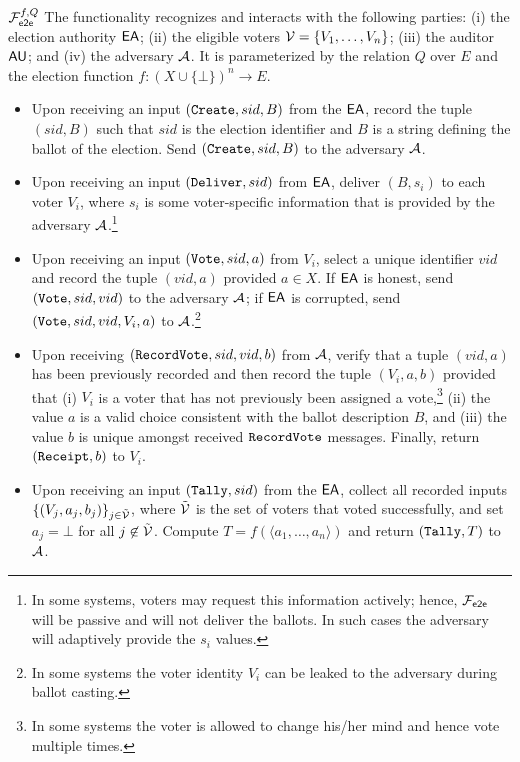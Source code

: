 \begin{nffunc}{$\mathcal{F}_{\mathsf{e2e}}^{f,Q}$}
  The functionality recognizes and interacts with the following
  parties: (i) the election authority $\mathsf{EA}$; (ii) the eligible voters
  $\mathcal{V}= \{V_1,\ldots, V_n\}$; (iii) the auditor $\mathsf{AU}$; and (iv) the
  adversary $\mathcal{A}$.  It is parameterized by the relation $Q$ over
  $E$ and the election function $f:(X\cup\{\bot\})^n \rightarrow E$.
\vspace{1ex}
\begin{itemize}
\item Upon receiving an input $(\mathtt{Create}, sid, B)$ from the $\mathsf{EA}$,
  record the tuple $(sid, B)$ such that $sid$ is the election
  identifier and $B$ is a string defining the ballot of the election.
  Send $(\mathtt{Create}, sid, B)$ to the adversary $\mathcal{A}$.

\item Upon receiving an input $(\mathtt{Deliver}, sid)$ from $\mathsf{EA}$, deliver
  $(B, s_i)$ to each voter $V_i$, where $s_i$ is some voter-specific
  information that is provided by the adversary $\mathcal{A}$.\footnote{In
    some systems, voters may request this information actively; hence,
    $\mathcal{F}_{\mathsf{e2e}}$ will be passive and will not deliver the ballots.  In such
    cases the adversary will adaptively provide the $s_i$ values.}

\item Upon receiving an input $(\mathtt{Vote}, sid, a)$ from $V_i$, select a
  unique identifier $vid$ and record the tuple $(vid, a)$ provided
  $a\in X$.  If $\mathsf{EA}$ is honest, send $(\mathtt{Vote},sid, vid)$ to the
  adversary $\mathcal{A}$; if $\mathsf{EA}$ is corrupted, send
  $(\mathtt{Vote}, sid, vid, V_i, a)$ to $\mathcal{A}$.\footnote{In some systems
    the voter identity $V_i$ can be leaked to the adversary during
    ballot casting.}

\item Upon receiving $(\mathtt{RecordVote}, sid, vid, b)$ from $\mathcal{A}$,
  verify that a tuple $(vid, a)$ has been previously recorded and then
  record the tuple $(V_i, a, b)$ provided that (i) $V_i$ is a voter
  that has not previously been assigned a vote,\footnote{In some
    systems the voter is allowed to change his/her mind and hence vote
    multiple times.} (ii) the value $a$ is a valid choice consistent
  with the ballot description $B$, and (iii) the value $b$ is unique
  amongst received $\mathtt{RecordVote}$ messages.  Finally, return
  $(\mathtt{Receipt}, b)$ to $V_i$.

\item Upon receiving an input $(\mathtt{Tally}, sid)$ from the $\mathsf{EA}$, collect
  all recorded inputs $\{(V_j, a_j, b_j)\}_{j\in \tilde{\mathcal{V}}}$,
  where $\tilde{\mathcal{V}}$ is the set of voters that voted successfully,
  and set $a_j = \bot$ for all $j\not\in \tilde{\mathcal{V}}$.  Compute
  $T =f(\langle a_{1}, \ldots, a_n \rangle )$ and return $(\mathtt{Tally}, T)$
  to $\mathcal{A}$.


\end{itemize}
\end{nffunc}
